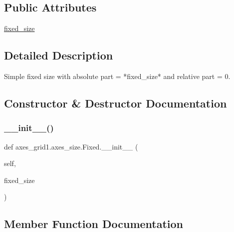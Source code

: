 \subsection*{Public Attributes}
\begin{DoxyCompactItemize}
\item 
\hyperlink{classaxes__grid1_1_1axes__size_1_1Fixed_a0f388282ddd82776e183d054fc310708}{fixed\+\_\+size}
\end{DoxyCompactItemize}


\subsection{Detailed Description}
\begin{DoxyVerb}Simple fixed size with absolute part = *fixed_size* and relative part = 0.
\end{DoxyVerb}
 

\subsection{Constructor \& Destructor Documentation}
\mbox{\label{classaxes__grid1_1_1axes__size_1_1Fixed_a6cff5ffe86427197f5033c7b346a2341}} 
\subsubsection{\texorpdfstring{\+\_\+\+\_\+init\+\_\+\+\_\+()}{\_\_init\_\_()}}
{\footnotesize\ttfamily def axes\+\_\+grid1.\+axes\+\_\+size.\+Fixed.\+\_\+\+\_\+init\+\_\+\+\_\+ (\begin{DoxyParamCaption}\item[{}]{self,  }\item[{}]{fixed\+\_\+size }\end{DoxyParamCaption})}



\subsection{Member Function Documentation}
\mbox{\label{classaxes__grid1_1_1axes__size_1_1Fixed_a1743e221aff9893afa8adf8f0214865d}} 
